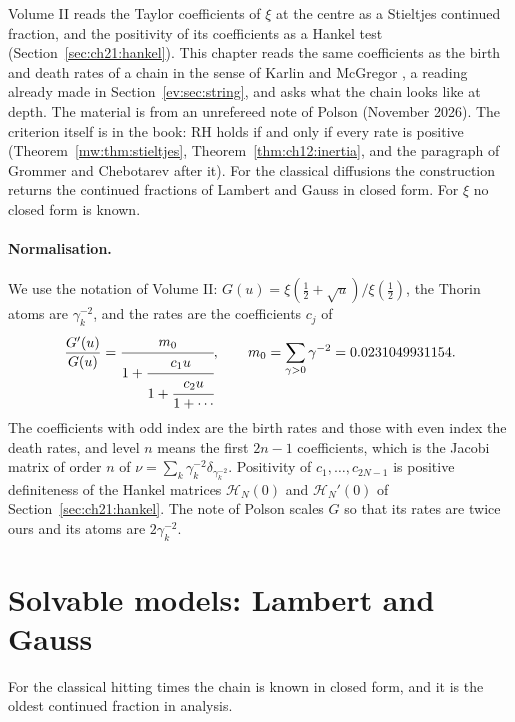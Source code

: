 \label{b:ch:chain}

\noindent
Volume II reads the Taylor coefficients of $\xi$ at the centre as a Stieltjes continued fraction, and the positivity of its coefficients as a Hankel test (Section~\ref{sec:ch21:hankel}). This chapter reads the same coefficients as the birth and death rates of a chain in the sense of Karlin and McGregor \cite{KarlinMcGregor57}, a reading already made in Section~\ref{ev:sec:string}, and asks what the chain looks like at depth. The material is from an unrefereed note of Polson (November 2026). The criterion itself is in the book: RH holds if and only if every rate is positive (Theorem~\ref{mw:thm:stieltjes}, Theorem~\ref{thm:ch12:inertia}, and the paragraph of Grommer and Chebotarev after it). For the classical diffusions the construction returns the continued fractions of Lambert and Gauss in closed form. For $\xi$ no closed form is known.
\paragraph{Normalisation.} We use the notation of Volume II: $G(u)=\xi(\frac12+\sqrt u)/\xi(\frac12)$, the Thorin atoms are $\gamma_k^{-2}$, and the rates are the coefficients $c_j$ of
\begin{equation}\label{b:eq:Sfrac}
\frac{G'(u)}{G(u)}=\cfrac{m_0}{1+\cfrac{c_1u}{1+\cfrac{c_2u}{1+\cdots}}},\qquad m_0=\sum_{\gamma>0}\gamma^{-2}=0.0231049931154 .
\end{equation}
The coefficients with odd index are the birth rates and those with even index the death rates, and level $n$ means the first $2n-1$ coefficients, which is the Jacobi matrix of order $n$ of $\nu=\sum_k\gamma_k^{-2}\delta_{\gamma_k^{-2}}$. Positivity of $c_1,\dots,c_{2N-1}$ is positive definiteness of the Hankel matrices $\mathcal H_N(0)$ and $\mathcal H_N'(0)$ of Section~\ref{sec:ch21:hankel}. The note of Polson scales $G$ so that its rates are twice ours and its atoms are $2\gamma_k^{-2}$.

\section{Solvable models: Lambert and Gauss}

For the classical hitting times the chain is known in closed form, and it is the oldest continued fraction in analysis.

